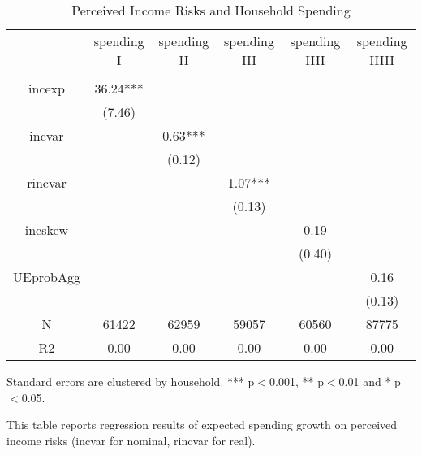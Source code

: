 
\begin{table}[p]
\centering
\begin{adjustbox}{width={0.9\textwidth}}
\begin{threeparttable}
\caption{Perceived Income Risks and Household Spending}
\label{spending_reg}\begin{tabular}{cccccc}
\toprule
{} & spending I & spending II & spending III & spending IIII & spending IIIII \\
          &            &             &              &               &                \\
\midrule
incexp    &   36.24*** &             &              &               &                \\
          &     (7.46) &             &              &               &                \\
incvar    &            &     0.63*** &              &               &                \\
          &            &      (0.12) &              &               &                \\
rincvar   &            &             &      1.07*** &               &                \\
          &            &             &       (0.13) &               &                \\
incskew   &            &             &              &          0.19 &                \\
          &            &             &              &        (0.40) &                \\
UEprobAgg &            &             &              &               &           0.16 \\
          &            &             &              &               &         (0.13) \\
N         &      61422 &       62959 &        59057 &         60560 &          87775 \\
R2        &       0.00 &        0.00 &         0.00 &          0.00 &           0.00 \\
\bottomrule
\end{tabular}
\begin{tablenotes}\item Standard errors are clustered by household. *** p$<$0.001, ** p$<$0.01 and * p$<$0.05. 
\item This table reports regression results of expected spending growth on perceived income risks (incvar for nominal, rincvar for real).
\end{tablenotes}
\end{threeparttable}
\end{adjustbox}
\end{table}